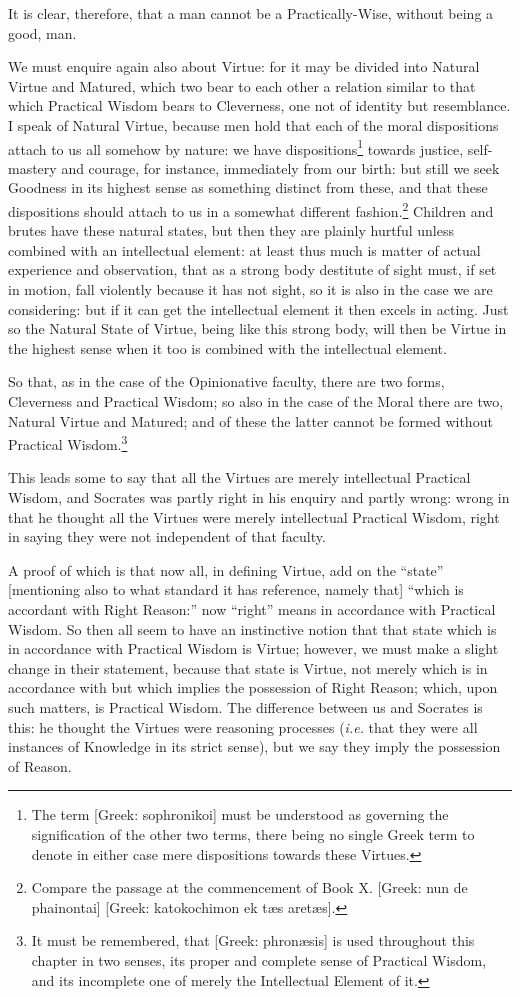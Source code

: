 It is clear, therefore, that a man cannot be a Practically-Wise, without being
a good, man.

We must enquire again also about Virtue: for it may be divided into Natural
Virtue and Matured, which two bear to each other a relation similar to that
which Practical Wisdom bears to Cleverness, one not of identity but
resemblance. I speak of Natural Virtue, because men hold that each of the moral
dispositions attach to us all somehow by nature: we have dispositions\footnote{The term [Greek: sophronikoi] must be understood as governing the signification
of the other two terms, there being no single Greek term to denote in either
case mere dispositions towards these Virtues.}
towards justice, self-mastery and courage, for instance, immediately from our
birth: but still we seek Goodness in its highest sense as something distinct
from these, and that these dispositions should attach to us in a somewhat
different fashion.\footnote{Compare the passage at the commencement of Book X. [Greek: nun de phainontai]
[Greek: katokochimon ek tæs aretæs].}
Children and brutes have these natural states, but then they are plainly
hurtful unless combined with an intellectual element: at least thus much is
matter of actual experience and observation, that as a strong body destitute of
sight must, if set in motion, fall violently because it has not sight, so it is
also in the case we are considering: but if it can get the intellectual element
it then excels in acting. Just so the Natural State of Virtue, being like this
strong body, will then be Virtue in the highest sense when it too is combined
with the intellectual element.

So that, as in the case of the Opinionative faculty, there are two forms,
Cleverness and Practical Wisdom; so also in the case of the Moral there are
two, Natural Virtue and Matured; and of these the latter cannot be formed
without Practical Wisdom.\footnote{It must be remembered, that [Greek: phronæsis] is used throughout this chapter
in two senses, its proper and complete sense of Practical Wisdom, and its
incomplete one of merely the Intellectual Element of it.}

This leads some to say that all the Virtues are merely intellectual Practical
Wisdom, and Socrates was partly right in his enquiry and partly wrong: wrong in
that he thought all the Virtues were merely intellectual Practical Wisdom,
right in saying they were not independent of that faculty.

A proof of which is that now all, in defining Virtue, add on the
“state” [mentioning also to what standard it has reference, namely
that] “which is accordant with Right Reason:” now
“right” means in accordance with Practical Wisdom. So then all seem
to have an instinctive notion that that state which is in accordance with
Practical Wisdom is Virtue; however, we must make a slight change in their
statement, because that state is Virtue, not merely which is in accordance with
but which implies the possession of Right Reason; which, upon such matters, is
Practical Wisdom. The difference between us and Socrates is this: he thought
the Virtues were reasoning processes (\emph{i.e.} that they were all instances
of Knowledge in its strict sense), but we say they imply the possession of
Reason.

